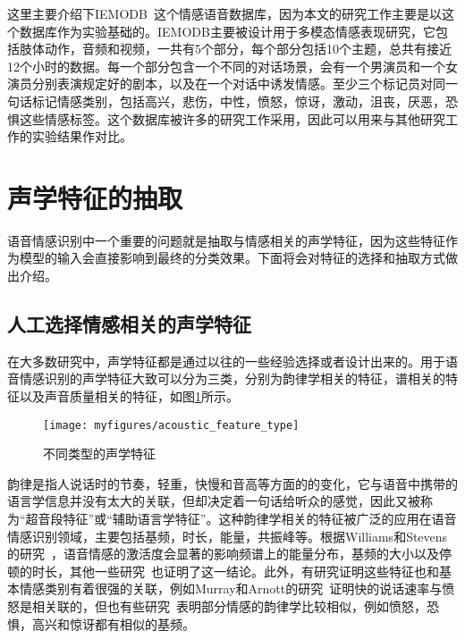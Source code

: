 
这里主要介绍下IEMODB~\cite{Busso2008IEMOCAP}这个情感语音数据库，因为本文的研究工作主要是以这个数据库作为实验基础的。IEMODB主要被设计用于多模态情感表现研究，它包括肢体动作，音频和视频，一共有5个部分，每个部分包括10个主题，总共有接近12个小时的数据。每一个部分包含一个不同的对话场景，会有一个男演员和一个女演员分别表演规定好的剧本，以及在一个对话中诱发情感。至少三个标记员对同一句话标记情感类别，包括高兴，悲伤，中性，愤怒，惊讶，激动，沮丧，厌恶，恐惧这些情感标签。这个数据库被许多的研究工作采用，因此可以用来与其他研究工作的实验结果作对比。

\section{声学特征的抽取}
\label{sec:acoustic_feature_extract}
语音情感识别中一个重要的问题就是抽取与情感相关的声学特征，因为这些特征作为模型的输入会直接影响到最终的分类效果。下面将会对特征的选择和抽取方式做出介绍。

\subsection{人工选择情感相关的声学特征}
\label{ssec:artifical_select}
在大多数研究中，声学特征都是通过以往的一些经验选择或者设计出来的。用于语音情感识别的声学特征大致可以分为三类，分别为韵律学相关的特征，谱相关的特征以及声音质量相关的特征，如图\ref{fig:acoustic_feature_type}所示。

\begin{figure}[htb] %
    \centering
    \texttt{[image: myfigures/acoustic\_feature\_type]}
    \caption{不同类型的声学特征}
    \label{fig:acoustic_feature_type}
\end{figure}

韵律是指人说话时的节奏，轻重，快慢和音高等方面的的变化，它与语音中携带的语言学信息并没有太大的关联，但却决定着一句话给听众的感觉，因此又被称为“超音段特征”或“辅助语言学特征”。这种韵律学相关的特征被广泛的应用在语音情感识别领域，主要包括基频，时长，能量，共振峰等。根据Williams和Stevens的研究~\cite{Williams1981Vocal}，语音情感的激活度会显著的影响频谱上的能量分布，基频的大小以及停顿的时长，其他一些研究~\cite{Johnstone2000Vocal, Cowie2003Describing}也证明了这一结论。此外，有研究证明这些特征也和基本情感类别有着很强的关联，例如Murray和Arnott的研究~\cite{Murray1993Toward}证明快的说话速率与愤怒是相关联的，但也有些研究~\cite{Ackroyd1997Digital, Cahn1990The}表明部分情感的韵律学比较相似，例如愤怒，恐惧，高兴和惊讶都有相似的基频。

